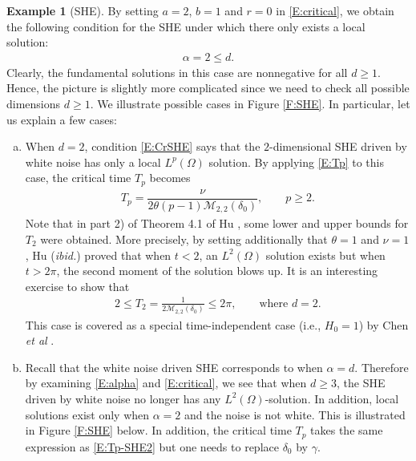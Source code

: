 \documentclass[a4paper,11pt]{article}
\numberwithin{equation}{section}
\numberwithin{equation}{section}
\theoremstyle{plain}
\theoremstyle{definition}
\newtheorem{example}[theorem]{Example}
\begin{document}
\begin{example}[SHE] \label{Eg:CriSHE}
  By setting $a=2$, $b=1$ and $r=0$ in \eqref{E:critical}, we obtain the following condition for the
  SHE under which there only exists a local solution:
  \begin{align} \label{E:CrSHE}
    \alpha = 2 \le d .
  \end{align}
  Clearly, the fundamental solutions in this case are nonnegative for all $d\ge 1$.  Hence, the
  picture is slightly more complicated since we need to check all possible dimensions $d\ge 1$.  We
  illustrate possible cases in Figure \ref{F:SHE}. In particular, let us explain a few cases:
  \begin{enumerate}[(a)]
    \item When $d=2$, condition \eqref{E:CrSHE} says that the $2$-dimensional SHE driven by white
      noise has only a local $L^p(\Omega)$ solution. By applying \eqref{E:Tp} to this case, the
      critical time $T_p$ becomes
      \begin{align} \label{E:Tp-SHE2}
        T_p = \dfrac{\nu}{2\theta (p-1) \mathcal{M}_{2,2}(\delta_0)}, \qquad p\ge 2.
      \end{align}
      Note that in part 2) of Theorem 4.1 of Hu \cite{Hu02Chaos}, some lower and upper bounds for $
      T_2$ were obtained. More precisely, by setting additionally that $\theta=1$ and $\nu=1$, Hu
      ({\it ibid.}) proved that when $t<2$, an $L^2(\Omega)$ solution exists but when $t>2\pi$, the
      second moment of the solution blows up. It is an interesting exercise to show that
      \begin{align*}
        2\le T_2 = \frac{1}{2 \mathcal{M}_{2,2}(\delta_0)} \le 2\pi, \qquad \text{where $d=2$.}
      \end{align*}
      This case is covered as a special time-independent case (i.e., $H_0=1$) by Chen {\it et al}
      \cite[Theorem 3.4 and Remark 3.13]{CDOT20}.
    \item Recall that the white noise driven SHE corresponds to when $\alpha=d$. Therefore by
      examining \eqref{E:alpha} and \eqref{E:critical}, we see that when $d\ge 3$, the SHE driven by
      white noise no longer has any $L^2(\Omega)$-solution. In addition, local solutions exist only
      when $\alpha=2$ and the noise is not white. This is illustrated in Figure \ref{F:SHE} below.
      In addition, the critical time $T_p$ takes the same expression as \eqref{E:Tp-SHE2} but one
      needs to replace $\delta_0$ by $\gamma$.
  \end{enumerate}
\end{example}
\end{document}
